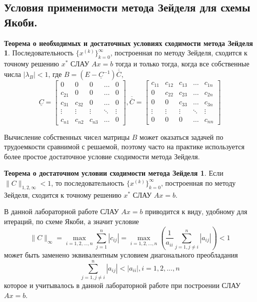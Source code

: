 \documentclass[a4paper, 12pt]{article}
\theoremstyle{definition}
\begin{document}
	\subsection{Условия применимости метода Зейделя для схемы Якоби.}
	\newtheorem*{SeidelHardTheorem*}{Теорема о необходимых и достаточных условиях сходимости метода Зейделя}
	\begin{SeidelHardTheorem*}
		Последовательность $\{x^{(k)}\}_{k=0}^\infty$, построенная по методу Зейделя, сходится к точному решению $x^*$ СЛАУ $Ax=b$ тогда и только тогда, когда все собственные числа $|\lambda_B|<1$, где $B=(E-\underline{C}^{-1})\overline{\overline C}$,
		\begin{equation}
			\underline{C} = 
			\begin{bmatrix}
				0 & 0 & 0 & \dots & 0 \\
				c_{21} & 0 & 0 & \dots & 0 \\
				c_{31} & c_{32} & 0 & \dots & 0 \\
				\vdots & \vdots & \vdots & \ddots & \vdots \\
				c_{n1} & c_{n2} & c_{n3} & \dots & 0
			\end{bmatrix} , 
			\overline{\overline C} = 
			\begin{bmatrix}
				c_{11} & c_{12} & c_{13} & \dots & c_{1n} \\
				0 & c_{22} & c_{23} & \dots & c_{2n} \\
				0 & 0 & c_{33} & \dots & c_{3n} \\
				\vdots & \vdots & \vdots & \ddots & \vdots \\
				0 & 0 & 0 & \dots & c_{nn}
			\end{bmatrix}
		\end{equation}
	\end{SeidelHardTheorem*}
	Вычисление собственных чисел матрицы $B$ может оказаться задачей по трудоемкости сравнимой с решаемой, поэтому часто на практике используется более простое достаточное условие сходимости метода Зейделя.
	\newtheorem*{SeidelSoftTheorem*}{Теорема о достаточном условии сходимости метода Зейделя}
	\begin{SeidelSoftTheorem*}
		Если $\|C\|_{1,2,\infty}<1$, то последовательность $\{x^{(k)}\}_{k=0}^\infty$, построенная по методу Зейделя, сходится к точному решению $x^*$ СЛАУ $Ax=b$.
	\end{SeidelSoftTheorem*}
	В данной лабораторной работе СЛАУ $Ax=b$ приводится к виду, удобному для итераций, по схеме Якоби, а значит условие
	\begin{equation}
		\|C\|_{\infty}=\max\limits_{i=1,2,...,n}\sum\limits_{j=1}^n |c_{ij}|=\max\limits_{i=1,2,...,n}(\frac{1}{a_{ii}}\sum\limits_{j=1,j\neq i}^n |a_{ij}|)<1
	\end{equation}
	может быть заменено эквивалентным условием диагонального преобладания
	\begin{equation}
		\sum\limits_{j=1,j\neq i}^n |a_{ij}|<|a_{ii}|, i=1,2,...,n
	\end{equation}
	которое и учитывалось в данной лабораторной работе при построении СЛАУ $Ax=b$.
	
\end{document}
